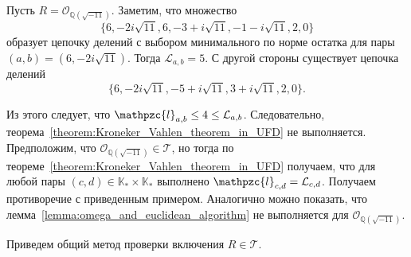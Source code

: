 \documentclass[_00_dissertation.tex]{subfiles}
\begin{document}
\begin{example}\label{example:Z[sqrt{-11}]}
    Пусть $R = \mathcal{O}_{\mathbb{Q}(\sqrt{-11})}$.
    Заметим, что множество
    \begin{equation*}
        \{6,-2i\sqrt{11},6,-3+i\sqrt{11},-1-i\sqrt{11},2,0\}
    \end{equation*}
    образует цепочку делений с выбором минимального по норме остатка для пары $(a,b)=(6,-2i\sqrt{11})$.
    Тогда $\mathcal{L}_{a,b}=5$.
    С другой стороны существует цепочка делений
    \begin{equation*}
        \{6,-2i\sqrt{11},-5+i\sqrt{11},3+i\sqrt{11},2,0\}.
    \end{equation*}
    
    Из этого следует, что $\mathpzc{l}_{a,b}\le 4\le \mathcal{L}_{a,b}$.
    Следовательно, теорема~\ref{theorem:Kroneker_Vahlen_theorem_in_UFD} не выполняется.
    Предположим, что $\mathcal{O}_{\mathbb{Q}(\sqrt{-11})} \in \mathcal{T}$, но тогда по теореме~\ref{theorem:Kroneker_Vahlen_theorem_in_UFD} получаем, что для любой пары $(c,d)\in\mathbb{K}_* \times\mathbb{K}_*$ выполнено $\mathpzc{l}_{c,d}=\mathcal{L}_{c,d}$.
    Получаем противоречие с приведенным примером.
    Аналогично можно показать, что лемма~\ref{lemma:omega_and_euclidean_algorithm} не выполняется для $\mathcal{O}_{\mathbb{Q}(\sqrt{-11})}$.
\end{example}


Приведем общий метод проверки включения $R \in \mathcal{T}$.
\end{document}

